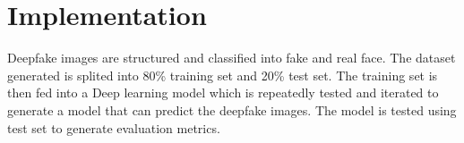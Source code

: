         \section{Implementation}
        Deepfake images are structured and classified into fake and real face. The dataset generated is splited into 80\% training set and 20\% test set. The training set is then fed into a Deep learning model which is repeatedly tested and iterated to generate a model that can predict the deepfake images. The model is tested using test set to generate evaluation metrics.
        \vspace{0.5in}
        \begin{figure}[hbt!]
        \end{figure}

